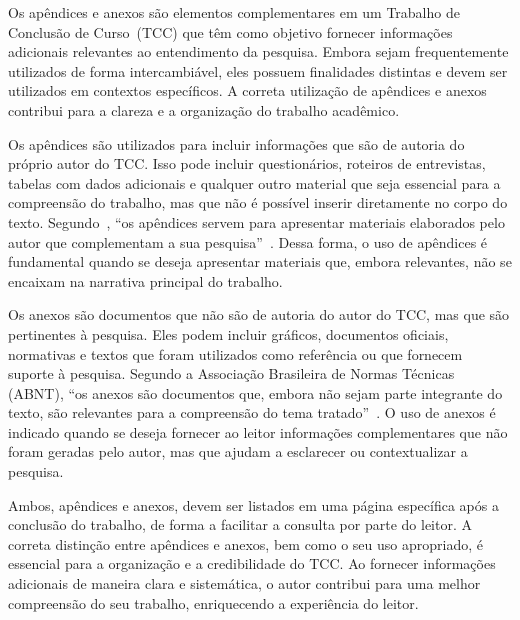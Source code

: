 \documentclass[
    12pt
    ,oneside
    ,a4paper
    ,chapter=TITLE
    ,section=TITLE
    ,sumario=abnt-6027-2012]{abntex2}
\begin{document}
\postextual






Os apêndices e anexos são elementos complementares em um Trabalho de Conclusão de Curso~(TCC) que têm como objetivo fornecer informações adicionais relevantes ao entendimento da pesquisa. Embora sejam frequentemente utilizados de forma intercambiável, eles possuem finalidades distintas e devem ser utilizados em contextos específicos. A correta utilização de apêndices e anexos contribui para a clareza e a organização do trabalho acadêmico.

Os apêndices são utilizados para incluir informações que são de autoria do próprio autor do TCC. Isso pode incluir questionários, roteiros de entrevistas, tabelas com dados adicionais e qualquer outro material que seja essencial para a compreensão do trabalho, mas que não é possível inserir diretamente no corpo do texto. Segundo~, ``os apêndices servem para apresentar materiais elaborados pelo autor que complementam a sua pesquisa''~\cite{severino}. Dessa forma, o uso de apêndices é fundamental quando se deseja apresentar materiais que, embora relevantes, não se encaixam na narrativa principal do trabalho.



Os anexos são documentos que não são de autoria do autor do TCC, mas que são pertinentes à pesquisa. Eles podem incluir gráficos, documentos oficiais, normativas e textos que foram utilizados como referência ou que fornecem suporte à pesquisa. Segundo a Associação Brasileira de Normas Técnicas (ABNT), ``os anexos são documentos que, embora não sejam parte integrante do texto, são relevantes para a compreensão do tema tratado''~\cite{abnt2012}. O uso de anexos é indicado quando se deseja fornecer ao leitor informações complementares que não foram geradas pelo autor, mas que ajudam a esclarecer ou contextualizar a pesquisa.

Ambos, apêndices e anexos, devem ser listados em uma página específica após a conclusão do trabalho, de forma a facilitar a consulta por parte do leitor. A correta distinção entre apêndices e anexos, bem como o seu uso apropriado, é essencial para a organização e a credibilidade do TCC. Ao fornecer informações adicionais de maneira clara e sistemática, o autor contribui para uma melhor compreensão do seu trabalho, enriquecendo a experiência do leitor.
\end{document}
